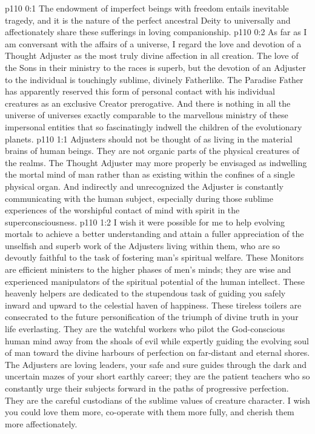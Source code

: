 \author{Solitary Messenger}
\vs p110 0:1 The endowment of imperfect beings with freedom entails inevitable tragedy, and it is the nature of the perfect ancestral Deity to universally and affectionately share these sufferings in loving companionship.
\vs p110 0:2 As far as I am conversant with the affairs of a universe, I regard the love and devotion of a Thought Adjuster as the most truly divine affection in all creation. The love of the Sons in their ministry to the races is superb, but the devotion of an Adjuster to the individual is touchingly sublime, divinely Fatherlike. The Paradise Father has apparently reserved this form of personal contact with his individual creatures as an exclusive Creator prerogative. And there is nothing in all the universe of universes exactly comparable to the marvellous ministry of these impersonal entities that so fascinatingly indwell the children of the evolutionary planets.
\vs p110 1:1 Adjusters should not be thought of as living in the material brains of human beings. They are not organic parts of the physical creatures of the realms. The Thought Adjuster may more properly be envisaged as indwelling the mortal mind of man rather than as existing within the confines of a single physical organ. And indirectly and unrecognized the Adjuster is constantly communicating with the human subject, especially during those sublime experiences of the worshipful contact of mind with spirit in the superconsciousness.
\vs p110 1:2 I wish it were possible for me to help evolving mortals to achieve a better understanding and attain a fuller appreciation of the unselfish and superb work of the Adjusters living within them, who are so devoutly faithful to the task of fostering man’s spiritual welfare. These Monitors are efficient ministers to the higher phases of men’s minds; they are wise and experienced manipulators of the spiritual potential of the human intellect. These heavenly helpers are dedicated to the stupendous task of guiding you safely inward and upward to the celestial haven of happiness. These tireless toilers are consecrated to the future personification of the triumph of divine truth in your life everlasting. They are the watchful workers who pilot the God\hyp{}conscious human mind away from the shoals of evil while expertly guiding the evolving soul of man toward the divine harbours of perfection on far\hyp{}distant and eternal shores. The Adjusters are loving leaders, your safe and sure guides through the dark and uncertain mazes of your short earthly career; they are the patient teachers who so constantly urge their subjects forward in the paths of progressive perfection. They are the careful custodians of the sublime values of creature character. I wish you could love them more, co\hyp{}operate with them more fully, and cherish them more affectionately.
